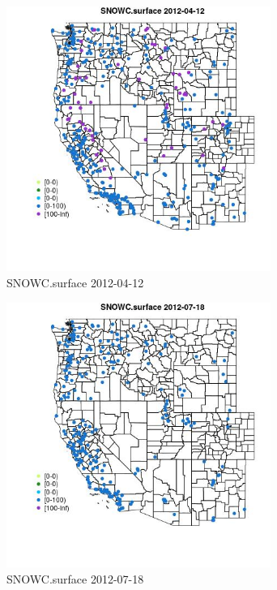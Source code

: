\begin{figure} 
\centering  
\includegraphics[width=0.77\textwidth]{Code_Outputs/Report_ML_input_PM25_Step4_part_e_de_duplicated_aves_compiled_2019-05-14wNAs_MapObsSNOWCsurface2012-04-12.jpg} 
\caption{\label{fig:Report_ML_input_PM25_Step4_part_e_de_duplicated_aves_compiled_2019-05-14wNAsMapObsSNOWCsurface2012-04-12}SNOWC.surface 2012-04-12} 
\end{figure} 
 

\begin{figure} 
\centering  
\includegraphics[width=0.77\textwidth]{Code_Outputs/Report_ML_input_PM25_Step4_part_e_de_duplicated_aves_compiled_2019-05-14wNAs_MapObsSNOWCsurface2012-07-18.jpg} 
\caption{\label{fig:Report_ML_input_PM25_Step4_part_e_de_duplicated_aves_compiled_2019-05-14wNAsMapObsSNOWCsurface2012-07-18}SNOWC.surface 2012-07-18} 
\end{figure} 
 

